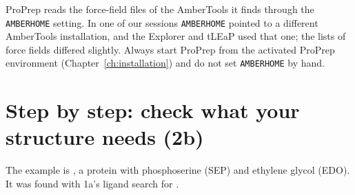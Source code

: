 \begin{watchout}
ProPrep reads the force-field files of the AmberTools it finds through the
\texttt{AMBERHOME} setting. In one of our sessions \texttt{AMBERHOME} pointed
to a different AmberTools installation, and the Explorer and tLEaP used that
one; the lists of force fields differed slightly. Always start ProPrep from
the activated ProPrep environment (Chapter~\ref{ch:installation}) and do not
set \texttt{AMBERHOME} by hand.
\end{watchout}

\section{Step by step: check what your structure needs (2b)}
\label{sec:forcefields-check}

The example is , a protein with phosphoserine (SEP) and ethylene
glycol (EDO). It was found with 1a's ligand search for .

